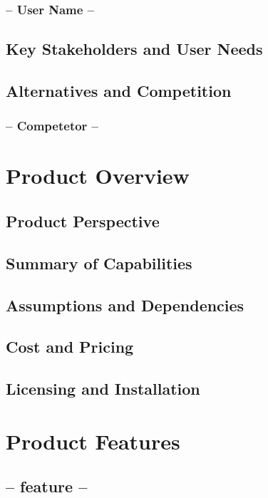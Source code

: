 \documentclass[12pt,norsk,a4paper]{article}
\begin{document}
\subsubsection{-- User Name --}

\subsection{Key Stakeholders and User Needs}

\subsection{Alternatives and Competition}

\subsubsection{-- Competetor --}

\section{Product Overview}

\subsection{Product Perspective}

\subsection{Summary of Capabilities}

\subsection{Assumptions and Dependencies}

\subsection{Cost and Pricing}

\subsection{Licensing and Installation}

\section{Product Features}

\subsection{-- feature --}
\end{document}

